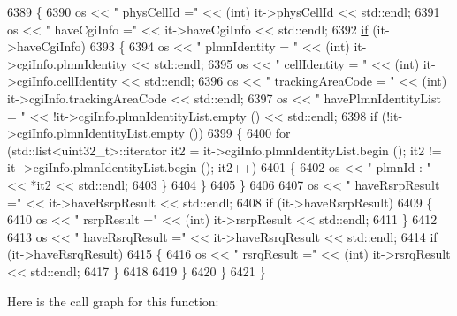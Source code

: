 \begin{DoxyCode}
6389         \{
6390           os << \textcolor{stringliteral}{"   physCellId ="} << (int) it->physCellId << std::endl;
6391           os << \textcolor{stringliteral}{"   haveCgiInfo ="} << it->haveCgiInfo << std::endl;
6392           \hyperlink{loss__ITU1238_8m_a419d895abe1313c35fa353c93802647e}{if} (it->haveCgiInfo)
6393             \{
6394               os << \textcolor{stringliteral}{"      plmnIdentity = "} << (int) it->cgiInfo.plmnIdentity << std::endl;
6395               os << \textcolor{stringliteral}{"      cellIdentity = "} << (\textcolor{keywordtype}{int}) it->cgiInfo.cellIdentity << std::endl;
6396               os << \textcolor{stringliteral}{"      trackingAreaCode = "} << (int) it->cgiInfo.trackingAreaCode << std::endl;
6397               os << \textcolor{stringliteral}{"      havePlmnIdentityList = "} << !it->cgiInfo.plmnIdentityList.empty () << std::endl;
6398               \textcolor{keywordflow}{if} (!it->cgiInfo.plmnIdentityList.empty ())
6399                 \{
6400                   \textcolor{keywordflow}{for} (std::list<uint32\_t>::iterator it2 = it->cgiInfo.plmnIdentityList.begin (); it2 != it
      ->cgiInfo.plmnIdentityList.begin (); it2++)
6401                     \{
6402                       os << \textcolor{stringliteral}{"         plmnId : "} << *it2 << std::endl;
6403                     \}
6404                 \}
6405             \}
6406 
6407           os << \textcolor{stringliteral}{"   haveRsrpResult ="} << it->haveRsrpResult << std::endl;
6408           \textcolor{keywordflow}{if} (it->haveRsrpResult)
6409             \{
6410               os << \textcolor{stringliteral}{"   rsrpResult ="} << (int) it->rsrpResult << std::endl;
6411             \}
6412 
6413           os << \textcolor{stringliteral}{"   haveRsrqResult ="} << it->haveRsrqResult << std::endl;
6414           \textcolor{keywordflow}{if} (it->haveRsrqResult)
6415             \{
6416               os << \textcolor{stringliteral}{"   rsrqResult ="} << (int) it->rsrqResult << std::endl;
6417             \}
6418 
6419         \}
6420     \}
6421 \}
\end{DoxyCode}


Here is the call graph for this function\+:


